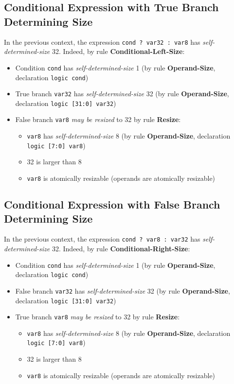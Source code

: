 \documentclass{article}
\newcommand{\sv}[1]{\texttt{#1}}
\newcommand{\sds}{\emph{self-determined-size}}
\newcommand{\mbr}{\emph{may be resized}}
\begin{document}
\subsection{Conditional Expression with True Branch Determining Size}

In the previous context, the expression \sv{cond ? var32 : var8} has
\sds{} 32. Indeed, by rule \textbf{Conditional-Left-Size}:

\begin{itemize}
  \item Condition \sv{cond} has \sds{} 1 (by rule
    \textbf{Operand-Size}, declaration \sv{logic cond})
  \item True branch \sv{var32} has \sds{} 32 (by rule
    \textbf{Operand-Size}, declaration \sv{logic [31:0] var32})
  \item False branch \sv{var8} \mbr{} to 32 by rule
    \textbf{Resize}:
    \begin{itemize}
      \item \sv{var8} has \sds{} 8 (by rule
        \textbf{Operand-Size}, declaration \sv{logic [7:0] var8})
      \item 32 is larger than 8
      \item \sv{var8} is atomically resizable (operands are atomically
        resizable)
    \end{itemize}
\end{itemize}

\subsection{Conditional Expression with False Branch Determining Size}

In the previous context, the expression \sv{cond ? var8 : var32} has
\sds{} 32. Indeed, by rule
\textbf{Conditional-Right-Size}:

\begin{itemize}
  \item Condition \sv{cond} has \sds{} 1 (by rule
    \textbf{Operand-Size}, declaration \sv{logic cond})
  \item False branch \sv{var32} has \sds{} 32 (by rule
    \textbf{Operand-Size}, declaration \sv{logic [31:0] var32})
  \item True branch \sv{var8} \mbr{} to 32 by rule
    \textbf{Resize}:
    \begin{itemize}
      \item \sv{var8} has \sds{} 8 (by rule
        \textbf{Operand-Size}, declaration \sv{logic [7:0] var8})
      \item 32 is larger than 8
      \item \sv{var8} is atomically resizable (operands are atomically
        resizable)
    \end{itemize}
\end{itemize}
\end{document}
